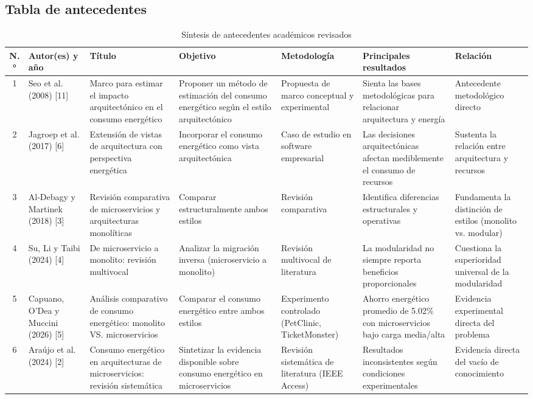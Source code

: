 \subsection{Tabla de antecedentes}

\begin{table}[htbp]
\centering
\caption{Síntesis de antecedentes académicos revisados}
\label{tab:antecedentes}
\small
\begin{tabular}{|c|l|p{3cm}|p{3cm}|p{2.5cm}|p{3.5cm}|p{3cm}|}
\hline
\textbf{N.°} & \textbf{Autor(es) y año} & \textbf{Título} & \textbf{Objetivo} & \textbf{Metodología} & \textbf{Principales resultados} & \textbf{Relación} \\ \hline
1 & Seo et al. (2008) [11] & Marco para estimar el impacto arquitectónico en el consumo energético & Proponer un método de estimación del consumo energético según el estilo arquitectónico & Propuesta de marco conceptual y experimental & Sienta las bases metodológicas para relacionar arquitectura y energía & Antecedente metodológico directo \\ \hline
2 & Jagroep et al. (2017) [6] & Extensión de vistas de arquitectura con perspectiva energética & Incorporar el consumo energético como vista arquitectónica & Caso de estudio en software empresarial & Las decisiones arquitectónicas afectan mediblemente el consumo de recursos & Sustenta la relación entre arquitectura y recursos \\ \hline
3 & Al-Debagy y Martinek (2018) [3] & Revisión comparativa de microservicios y arquitecturas monolíticas & Comparar estructuralmente ambos estilos & Revisión comparativa & Identifica diferencias estructurales y operativas & Fundamenta la distinción de estilos (monolito vs. modular) \\ \hline
4 & Su, Li y Taibi (2024) [4] & De microservicio a monolito: revisión multivocal & Analizar la migración inversa (microservicio a monolito) & Revisión multivocal de literatura & La modularidad no siempre reporta beneficios proporcionales & Cuestiona la superioridad universal de la modularidad \\ \hline
5 & Capuano, O'Dea y Muccini (2026) [5] & Análisis comparativo de consumo energético: monolito VS. microservicios & Comparar el consumo energético entre ambos estilos & Experimento controlado (PetClinic, TicketMonster) & Ahorro energético promedio de 5.02\% con microservicios bajo carga media/alta & Evidencia experimental directa del problema \\ \hline
6 & Araújo et al. (2024) [2] & Consumo energético en arquitecturas de microservicios: revisión sistemática & Sintetizar la evidencia disponible sobre consumo energético en microservicios & Revisión sistemática de literatura (IEEE Access) & Resultados inconsistentes según condiciones experimentales & Evidencia directa del vacío de conocimiento \\ \hline

\end{tabular}
\end{table}
